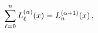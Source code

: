\[\sum_{\ell=0}^{n}\mathop{L^{(\alpha)}_{\ell}\/}\nolimits\!\left(x\right)=%
\mathop{L^{(\alpha+1)}_{n}\/}\nolimits\!\left(x\right),\]